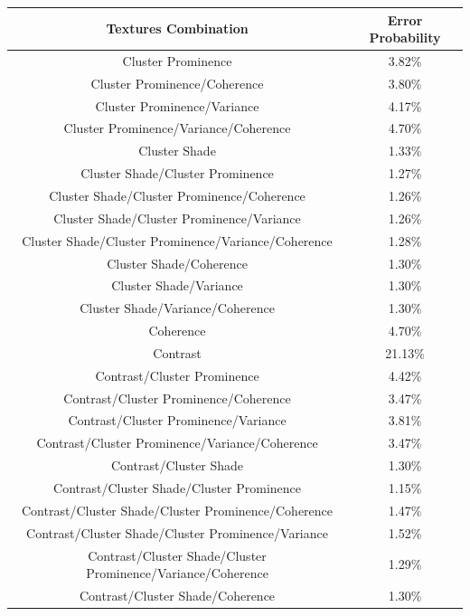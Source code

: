 \begin{table}[H]
    \centering
    \begin{tabular}{ |c |c |}
     \hline
        Textures Combination & Error Probability \\ \hline \hline
        Cluster Prominence & 3.82\% \\ \hline
        Cluster Prominence/Coherence & 3.80\% \\ \hline
        Cluster Prominence/Variance & 4.17\% \\ \hline
        Cluster Prominence/Variance/Coherence & 4.70\% \\ \hline
        Cluster Shade & 1.33\% \\ \hline
        Cluster Shade/Cluster Prominence & 1.27\% \\ \hline
        Cluster Shade/Cluster Prominence/Coherence & 1.26\% \\ \hline
        Cluster Shade/Cluster Prominence/Variance & 1.26\% \\ \hline
        Cluster Shade/Cluster Prominence/Variance/Coherence & 1.28\% \\ \hline
        Cluster Shade/Coherence & 1.30\% \\ \hline
        Cluster Shade/Variance & 1.30\% \\ \hline
        Cluster Shade/Variance/Coherence & 1.30\% \\ \hline
        Coherence & 4.70\% \\ \hline
        Contrast & 21.13\% \\ \hline
        Contrast/Cluster Prominence & 4.42\% \\ \hline
        Contrast/Cluster Prominence/Coherence & 3.47\% \\ \hline
        Contrast/Cluster Prominence/Variance & 3.81\% \\ \hline
        Contrast/Cluster Prominence/Variance/Coherence & 3.47\% \\ \hline
        Contrast/Cluster Shade & 1.30\% \\ \hline
        Contrast/Cluster Shade/Cluster Prominence & 1.15\% \\ \hline
        Contrast/Cluster Shade/Cluster Prominence/Coherence & 1.47\% \\ \hline
        Contrast/Cluster Shade/Cluster Prominence/Variance & 1.52\% \\ \hline
        Contrast/Cluster Shade/Cluster Prominence/Variance/Coherence & 1.29\% \\ 
        Contrast/Cluster Shade/Coherence & 1.30\% \\ \hline

\end{tabular}
\end{table}
